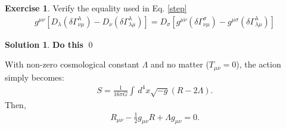\documentclass[a4paper,11pt]{article}
\numberwithin{equation}{section}
\theoremstyle{definition}
\newtheorem{exmp}{Exercise}[section]
\newtheorem{sln}{Solution}[section]
\newcommand{\f}[2]{\frac{#1}{#2}}
\newcommand{\lb}{\left[}
\newcommand{\rb}{\right]}
\begin{document}
\begin{exmp}\label{exxer}
	Verify the equality used in Eq. \eqref{step}
	\begin{align}
	g^{\mu\nu} \lb D_\lambda (\delta \Gamma^\lambda_{\nu\mu}) - D_\nu (\delta \Gamma^\lambda_{\lambda\mu})\rb
	=
	D_\sigma \lb g^{\mu\nu} (\delta \Gamma^\sigma_{\nu\mu}) - g^{\mu\sigma} (\delta \Gamma^\lambda_{\lambda\mu})  \rb
	\end{align}
	
	\begin{sln}
		\textbf{Do this} \qed\\
	\end{sln}
\end{exmp}














With non-zero cosmological constant $\Lambda$ and no matter ($T_{\mu\nu} = 0$), the action simply becomes:
\begin{align}
S = \f{1}{16\pi G}\int \,d^4x \sqrt{-g}(R - 2\Lambda).
\end{align}
Then,
\begin{align}\label{ricci}
R_{\mu\nu} - \f{1}{2}g_{\mu\nu}R + \Lambda g_{\mu\nu} = 0.
\end{align}
\end{document}
